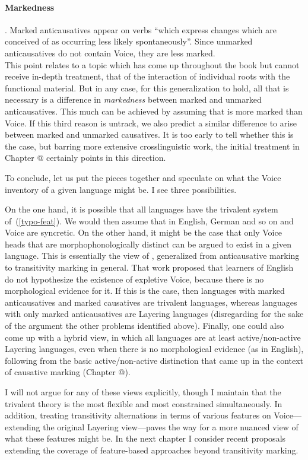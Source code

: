 \paragraph*{Markedness}. Marked anticausatives appear on verbs ``which express changes which are conceived of as occurring less likely spontaneously''. Since unmarked anticausatives do not contain Voice, they are less marked.\\
	This point relates to a topic which has come up throughout the book but cannot receive in-depth treatment, that of the interaction of individual roots with the functional material. But in any case, for this generalization to hold, all that is necessary is a difference in \emph{markedness} between marked and unmarked anticausatives. This much can be achieved by assuming that {\vz} is more marked than Voice. If this third reason is untrack, we also predict a similar difference to arise between marked and unmarked causatives. It is too early to tell whether this is the case, but barring more extensive crosslinguistic work, the initial treatment in Chapter @ certainly points in this direction.

To conclude, let us put the pieces together and speculate on what the Voice inventory of a given language might be. I see three possibilities.

On the one hand, it is possible that all languages have the trivalent system of~(\ref{typo-feat}). We would then assume that in English, German and so on {\vd} and Voice are syncretic. On the other hand, it might be the case that only Voice heads that are morphophonologically distinct can be argued to exist in a given language. This is essentially the view of \cite{layering15}, generalized from anticausative marking to transitivity marking in general. That work proposed that learners of English do not hypothesize the existence of expletive Voice, because there is no morphological evidence for it. If this is the case, then languages with marked anticausatives and marked causatives are trivalent languages, whereas languages with only marked anticausatives are Layering languages (disregarding for the sake of the argument the other problems identified above). Finally, one could also come up with a hybrid view, in which all languages are at least active/non-active Layering languages, even when there is no morphological evidence (as in English), following from the basic active/non-active distinction that came up in the context of causative marking (Chapter @).

I will not argue for any of these views explicitly, though I maintain that the trivalent theory is the most flexible and most constrained simultaneously. In addition, treating transitivity alternations in terms of various features on Voice---extending the original Layering view---paves the way for a more nuanced view of what these features might be. In the next chapter I consider recent proposals extending the coverage of feature-based approaches beyond transitivity marking.

